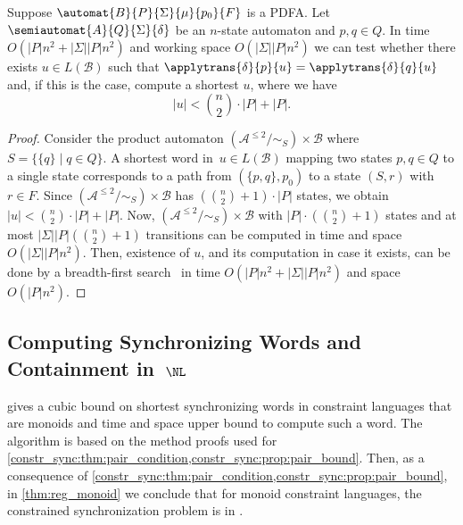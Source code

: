\begin{proposition}
	\label{constr_sync:prop:pair_bound}
	Suppose $\automat{B}{P}{\Sigma}{\mu}{p_0}{F}$ is a PDFA.
	Let $\semiautomat{A}{Q}{\Sigma}{\delta}$ be an $n$-state automaton
	and $p, q \in Q$. In time $O(|P|n^2 + |\Sigma||P|n^2)$
	and working space $O(|\Sigma||P|n^2)$
	we can test whether there exists $u \in L(\mathcal B)$ such that $\applytrans{\delta}{p}{u} = \applytrans{\delta}{q}{u}$
	and, if this is the case,
	compute a shortest $u$, where we have
	\[
	|u| < \binom{n}{2} \cdot |P| + |P|.
	\]
\end{proposition} 
\begin{proof}
	Consider the product automaton $( \mathcal A^{\le 2} / {\sim_S} ) \times \mathcal B$
	where $S = \{ \{q\} \mid q \in Q \}$.
	A shortest word in~$u \in L(\mathcal B)$ mapping two states $p,q \in Q$
	to a single state corresponds
	to a path from 
	$(\{p,q\}, p_0)$ to a state $(S, r)$ with $r \in F$.
	Since $( \mathcal A^{\le 2} / {\sim_S} ) \times \mathcal B$
	has  $(\binom{n}{2} + 1) \cdot |P|$ states,
	we obtain $|u| < \binom{n}{2} \cdot |P| + |P|$.
	Now, $( \mathcal A^{\le 2} / {\sim_S} ) \times \mathcal B$
    with $|P| \cdot (\binom{n}{2} + 1)$ states
	and at most $|\Sigma||P| (\binom{n}{2} + 1)$ transitions
	can be computed in 	time and space $O(|\Sigma||P|n^2)$.   
	Then, existence of $u$, and its computation in case it exists, can be done by 
	a breadth-first search~\cite{cormen01introduction}
	in  time $O(|P|n^2 + |\Sigma||P|n^2)$
	and space $O(|P|n^2)$.
\end{proof}

\subsection{Computing Synchronizing Words and Containment in~\texorpdfstring{$\NL$}{NL}}
\label{constr_sync:monoid-lang:shortest-sync-word}

gives a cubic bound on shortest synchronizing words
in constraint languages that are monoids
and time and space upper bound to compute such a word.
The algorithm is based on the method proofs used for
\cref{constr_sync:thm:pair_condition,constr_sync:prop:pair_bound}.
Then, as a consequence of \cref{constr_sync:thm:pair_condition,constr_sync:prop:pair_bound},
in \cref{thm:reg_monoid} we conclude that for monoid constraint languages, the constrained synchronization problem is in \NL.

